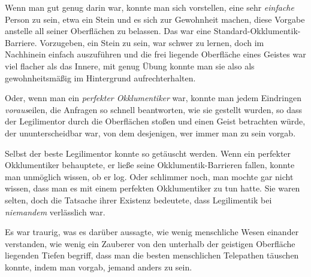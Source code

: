 Wenn man gut genug darin war, konnte man sich vorstellen, eine sehr \emph{einfache} Person zu sein, etwa ein Stein und es sich zur Gewohnheit machen, diese Vorgabe anstelle all seiner Oberflächen zu belassen. Das war eine Standard-Okklumentik-Barriere. Vorzugeben, ein Stein zu sein, war schwer zu lernen, doch im Nachhinein einfach auszuführen und die frei liegende Oberfläche eines Geistes war viel flacher als das Innere, mit genug Übung konnte man sie also als gewohnheitsmäßig im Hintergrund aufrechterhalten.

Oder, wenn man ein \emph{perfekter Okklumentiker} war, konnte man jedem Eindringen \emph{voraus}{}eilen, die Anfragen so schnell beantworten, wie sie gestellt wurden, so dass der Legilimentor durch die Oberflächen stoßen und einen Geist betrachten würde, der ununterscheidbar war, von dem desjenigen, wer immer man zu sein vorgab.

Selbst der beste Legilimentor konnte so getäuscht werden. Wenn ein perfekter Okklumentiker behauptete, er ließe seine Okklumentik-Barrieren fallen, konnte man unmöglich wissen, ob er log. Oder schlimmer noch, man mochte gar nicht wissen, dass man es mit einem perfekten Okklumentiker zu tun hatte. Sie waren selten, doch die Tatsache ihrer Existenz bedeutete, dass Legilimentik bei \emph{niemandem} verlässlich war.

Es war traurig, was es darüber aussagte, wie wenig menschliche Wesen einander verstanden, wie wenig ein Zauberer von den unterhalb der geistigen Oberfläche liegenden Tiefen begriff, dass man die besten menschlichen Telepathen täuschen konnte, indem man vorgab, jemand anders zu sein.

